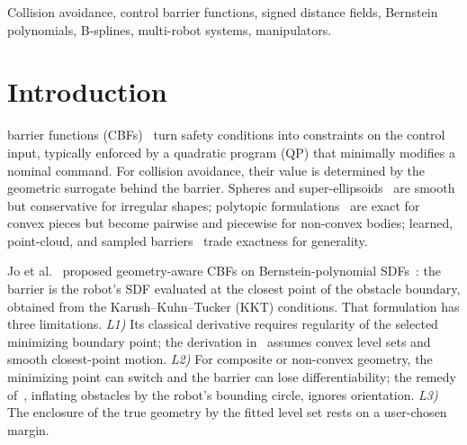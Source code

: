 \documentclass[journal]{IEEEtran}
\theoremstyle{definition}
\begin{document}
\begin{IEEEkeywords}
Collision avoidance, control barrier functions, signed distance fields, Bernstein polynomials,
B-splines, multi-robot systems, manipulators.
\end{IEEEkeywords}

\section{Introduction}\label{sec:intro}

 barrier functions (CBFs)~\cite{ames2019cbf} turn safety conditions into
constraints on the control input, typically enforced by a quadratic program (QP) that minimally
modifies a nominal command. For collision avoidance, their value is determined by the geometric
surrogate behind the barrier. Spheres and super-ellipsoids~\cite{wang2017safety,wang2017quadrotors}
are smooth but conservative for irregular shapes; polytopic
formulations~\cite{chen2025minkowski,thirugnanam2025strongly} are exact for convex pieces but become
pairwise and piecewise for non-convex bodies; learned, point-cloud, and sampled
barriers~\cite{khan2022gaussian,long2021learning,dai2024sailing,lutkus2025sampling} trade exactness
for generality.

Jo et al.~\cite{jo2026geometry} proposed geometry-aware CBFs on Bernstein-polynomial
SDFs~\cite{li2024representing}: the barrier is the robot's SDF evaluated at the closest point of the
obstacle boundary, obtained from the Karush--Kuhn--Tucker (KKT) conditions. That formulation has
three limitations. \emph{L1)} Its classical derivative requires regularity of the selected minimizing
boundary point; the derivation in~\cite{jo2026geometry} assumes convex level sets and smooth
closest-point motion. \emph{L2)} For composite or non-convex geometry, the minimizing point can
switch and the barrier can lose differentiability; the remedy of~\cite{jo2026geometry}, inflating obstacles by
the robot's bounding circle, ignores orientation. \emph{L3)} The enclosure of the true geometry by
the fitted level set rests on a user-chosen margin.
\end{document}
